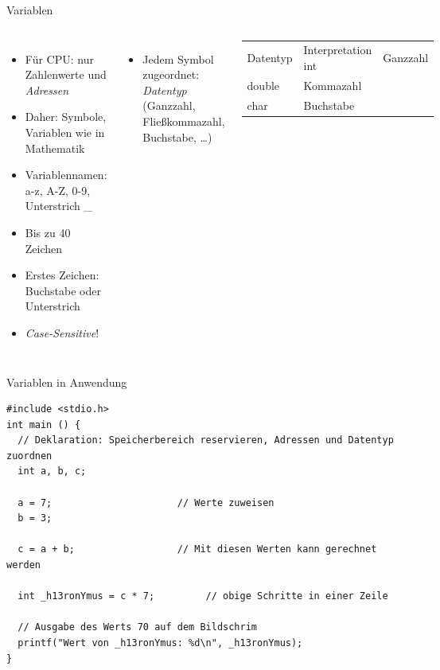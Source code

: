 \begin{frame}[fragile]{Variablen}
%
\begin{columns}[T]
\begin{itemize}
	\item Für CPU: nur Zahlenwerte und \emph{Adressen}
	\item Daher: Symbole, Variablen wie in Mathematik
	\item Variablennamen: a-z, A-Z, 0-9, Unterstrich \_
	\item Bis zu 40 Zeichen
	\item Erstes Zeichen: Buchstabe oder Unterstrich
	\item \emph{Case-Sensitive}!
\end{itemize}
%
\begin{itemize}
	\item Jedem Symbol zugeordnet: \emph{Datentyp} (Ganzzahl, Fließkommazahl, Buchstabe, \ldots)
\end{itemize}
%
\begin{tcolorbox}[title=Eine \emph{unvollständige} Liste von Datentypen in C]
	\begin{center}
	\begin{table}
	\begin{tabularx}
		{\linewidth}
		{CC}
		\toprule[1pt]
		
		Datentyp & Interpretation \tabcrlf
		int    & Ganzzahl \\
		double & Kommazahl \\
		char   & Buchstabe
	\end{tabularx}\newline
	\end{table}
	\end{center}	
\end{tcolorbox}
%
\end{columns}
%
\end{frame}


\begin{frame}[fragile]{Variablen in Anwendung}
%
\begin{codebox}
\begin{verbatim}
#include <stdio.h>
int main () {
  // Deklaration: Speicherbereich reservieren, Adressen und Datentyp zuordnen
  int a, b, c;
  
  a = 7; 	                  // Werte zuweisen
  b = 3;
  
  c = a + b; 	              // Mit diesen Werten kann gerechnet werden
  
  int _h13ronYmus = c * 7;         // obige Schritte in einer Zeile
  
  // Ausgabe des Werts 70 auf dem Bildschrim
  printf("Wert von _h13ronYmus: %d\n", _h13ronYmus);
}
\end{verbatim}
\end{codebox}
\end{frame}


